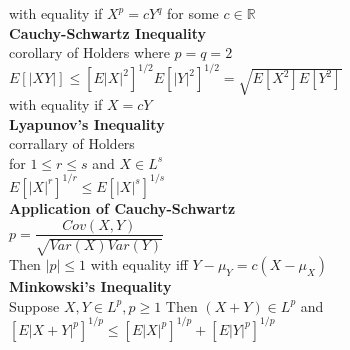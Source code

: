 \documentclass{article}
\begin{document}
\begin{flushleft}
with equality if $X^p=cY^q$ for some $c \in \mathbb{R}$\\
\textbf{Cauchy-Schwartz Inequality}\\
corollary of Holders where $p=q=2$\\
$E[|XY|]\leq [E|X|^2]^{1/2}E[|Y|^2]^{1/2}=\sqrt{E[X^2]E[Y^2]}$\\
with equality if $X=cY$\\
\textbf{Lyapunov's Inequality}\\
corrallary of Holders\\
for $1\leq r\leq s$ and $X\in L^s$\\
$E[|X|^r]^{1/r}\leq E[|X|^s]^{1/s}$\\
\textbf{Application of Cauchy-Schwartz}\\
$p=\dfrac{Cov(X,Y)}{\sqrt{Var(X)Var(Y)}}$\\
Then $|p|\leq 1$ with equality iff $Y-\mu_Y=c(X-\mu_X)$\\
\textbf{Minkowski's Inequality}\\
Suppose $X,Y \in L^p, p\geq 1$ Then $(X+Y)\in L^p$ and\\
$[E|X+Y|^p]^{1/p}\leq [E|X|^p]^{1/p}+[E|Y|^p]^{1/p}$\\

\end{flushleft}
\end{document}
